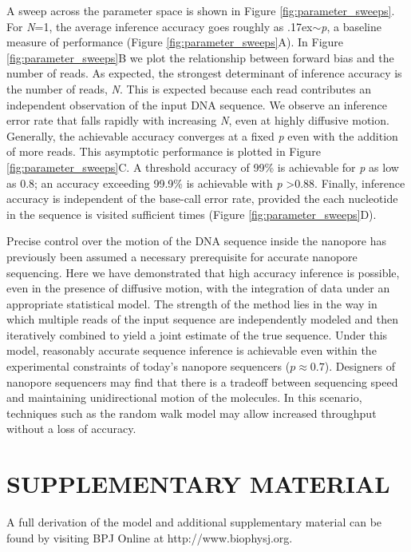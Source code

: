 \documentclass{biophys_letter}
\begin{document}
A sweep across the parameter space is shown in Figure \ref{fig:parameter_sweeps}.
For \emph{N}=1, the average inference accuracy goes roughly as {\raise.17ex\hbox{$\scriptstyle\sim$}}\emph{p}, a baseline measure of performance (Figure \ref{fig:parameter_sweeps}A).
In Figure \ref{fig:parameter_sweeps}B we plot the relationship between forward bias and the number of reads.
As expected, the strongest determinant of inference accuracy is the number of reads, \emph{N}.
This is expected because each read contributes an independent observation of the input DNA sequence.
We observe an inference error rate that falls rapidly with increasing \emph{N}, even at highly diffusive motion. 
Generally, the achievable accuracy converges at a fixed \emph{p} even with the addition of more reads.
This asymptotic performance is plotted in Figure \ref{fig:parameter_sweeps}C.
A threshold accuracy of 99\% is achievable for \emph{p} as low as 0.8; an accuracy exceeding 99.9\% is achievable with \emph{p} \textgreater 0.88.
Finally, inference accuracy is independent of the base-call error rate, provided the each nucleotide in the sequence is visited sufficient times (Figure \ref{fig:parameter_sweeps}D).

Precise control over the motion of the DNA sequence inside the nanopore has previously been assumed a necessary prerequisite for accurate nanopore sequencing.
Here we have demonstrated that high accuracy inference is possible, even in the presence of diffusive motion, with the integration of data under an appropriate statistical model. 
The strength of the method lies in the way in which multiple reads of the input sequence are independently modeled and then iteratively combined to yield a joint estimate of the true sequence.
Under this model, reasonably accurate sequence inference is achievable even within the experimental constraints of today's nanopore sequencers ($p \approx 0.7$).
Designers of nanopore sequencers may find that there is a tradeoff between sequencing speed and maintaining unidirectional motion of the molecules.
In this scenario, techniques such as the random walk model may allow increased throughput without a loss of accuracy.

\section*{SUPPLEMENTARY MATERIAL}

A full derivation of the model and additional supplementary material can be found by visiting BPJ Online at http://www.biophysj.org.\vspace*{6pt}
\end{document}
